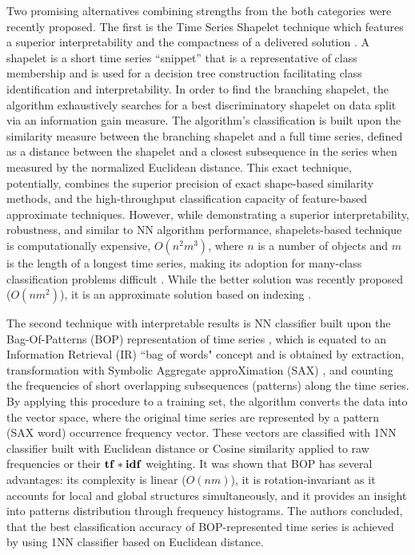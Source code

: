Two promising alternatives combining strengths from the both categories were recently proposed.
The first is the Time Series Shapelet technique which features a superior interpretability and the compactness of a 
delivered solution \cite{citeulike:7344347}. 
A shapelet is a short time series ``snippet'' that is a representative of class
membership and is used for a decision tree construction facilitating class identification and interpretability.
In order to find the branching shapelet, the algorithm exhaustively searches for a best discriminatory shapelet on data split 
via an information gain measure. The algorithm's classification is built upon the similarity measure between the branching 
shapelet and a full time series, defined as a distance between the shapelet and a closest subsequence in the series 
when measured by the normalized Euclidean distance. This exact technique, potentially, combines the superior precision of 
exact shape-based similarity methods, and the high-throughput classification capacity of feature-based approximate techniques. 
However, while demonstrating a superior interpretability, robustness, and similar to NN algorithm performance, shapelets-based 
technique is computationally expensive, $O(n^{2}m^{3})$, where $n$ is a number of objects and $m$ is the length of a longest 
time series, making its adoption for many-class classification problems difficult \cite{citeulike:11345338}. 
While the better solution was recently proposed ($O(nm^{2})$), it is an approximate solution based on indexing \cite{citeulike:12563493}.

The second technique with interpretable results is NN classifier built upon the Bag-Of-Patterns (BOP) representation of time series 
\cite{citeulike:10525778}, which is equated to an Information Retrieval (IR) ``bag of words" concept 
and is obtained by extraction, transformation with Symbolic Aggregate approXimation (SAX) \cite{sax}, and counting the frequencies
of short overlapping subsequences (patterns) along the time series.
By applying this procedure to a training set, the algorithm converts the data into the vector space, where the original time series are 
represented by a pattern (SAX word) occurrence frequency vector. These vectors are classified with 1NN classifier built with Euclidean 
distance or Cosine similarity applied to raw frequencies or their $\text{\textbf{tf}}\ast\text{\textbf{idf}}$ weighting. 
It was shown that BOP has several advantages: its complexity is linear ($O(nm)$), it is rotation-invariant as it accounts for local and 
global structures simultaneously, and it provides an insight into patterns distribution through frequency histograms.
The authors concluded, that the best classification accuracy of BOP-represented time series is achieved by using 1NN classifier based 
on Euclidean distance. 

